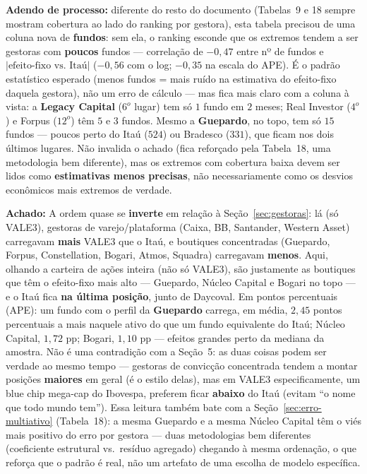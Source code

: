 \documentclass[11pt,a4paper]{article}
\newcommand{\aha}[1]{\par\vspace{4pt}\noindent\textbf{\color{vermelho}Achado:} #1\par\vspace{2pt}}
\begin{document}
\textbf{Adendo de processo:} diferente do resto do documento (Tabelas~9 e 18 sempre mostram
cobertura ao lado do ranking por gestora), esta tabela precisou de uma coluna nova de
\textbf{fundos}: sem ela, o ranking esconde que os extremos tendem a ser gestoras com \textbf{poucos}
fundos --- correlação de $-0{,}47$ entre nº de fundos e $|\text{efeito-fixo vs.\ Itaú}|$ ($-0{,}56$
com o log; $-0{,}35$ na escala do APE). É o padrão estatístico esperado (menos fundos = mais ruído na
estimativa do efeito-fixo daquela gestora), não um erro de cálculo --- mas fica mais claro com a
coluna à vista: a \textbf{Legacy Capital} ($6^o$ lugar) tem só $1$ fundo em $2$ meses; Real Investor
($4^o$) e Forpus ($12^o$) têm $5$ e $3$ fundos. Mesmo a \textbf{Guepardo}, no topo, tem só $15$
fundos --- poucos perto do Itaú ($524$) ou Bradesco ($331$), que ficam nos dois últimos lugares. Não
invalida o achado (fica reforçado pela Tabela~18, uma metodologia bem diferente), mas os extremos com
cobertura baixa devem ser lidos como \textbf{estimativas menos precisas}, não necessariamente como
os desvios econômicos mais extremos de verdade.

\aha{A ordem quase se \textbf{inverte} em relação à Seção~\ref{sec:gestoras}: lá (só VALE3),
gestoras de varejo/plataforma (Caixa, BB, Santander, Western Asset) carregavam \textbf{mais} VALE3
que o Itaú, e boutiques concentradas (Guepardo, Forpus, Constellation, Bogari, Atmos, Squadra)
carregavam \textbf{menos}. Aqui, olhando a carteira de ações inteira (não só VALE3), são
justamente as boutiques que têm o efeito-fixo mais alto --- Guepardo, Núcleo Capital e Bogari no
topo --- e o Itaú fica \textbf{na última posição}, junto de Daycoval. Em pontos percentuais (APE):
um fundo com o perfil da \textbf{Guepardo} carrega, em média, $2{,}45$ pontos percentuais a mais
naquele ativo do que um fundo equivalente do Itaú; Núcleo Capital, $1{,}72$ pp; Bogari, $1{,}10$ pp
--- efeitos grandes perto da mediana da amostra. Não é uma contradição com a Seção~5: as
duas coisas podem ser verdade ao mesmo tempo --- gestoras de convicção concentrada tendem a montar
posições \textbf{maiores} em geral (é o estilo delas), mas em VALE3 especificamente, um blue chip
mega-cap do Ibovespa, preferem ficar \textbf{abaixo} do Itaú (evitam ``o nome que todo mundo
tem''). Essa leitura também bate com a Seção~\ref{sec:erro-multiativo} (Tabela~18): a mesma
Guepardo e a mesma Núcleo Capital têm o viés mais positivo do erro por gestora --- duas
metodologias bem diferentes (coeficiente estrutural vs.\ resíduo agregado) chegando à mesma
ordenação, o que reforça que o padrão é real, não um artefato de uma escolha de modelo específica.}
\end{document}
